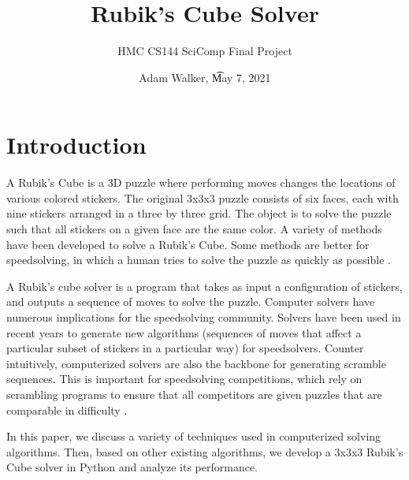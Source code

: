 \documentclass{article}
\title{Rubik's Cube Solver}
\author{HMC CS144 SciComp Final Project}
\date{Adam Walker, \t May 7, 2021}
\begin{document}
\maketitle

\section{Introduction}

A Rubik's Cube is a 3D puzzle where performing moves changes the locations of various colored stickers. The original 3x3x3 puzzle consists of six faces, each with nine stickers arranged in a three by three grid. The object is to solve the puzzle such that all stickers on a given face are the same color. A variety of methods have been developed to solve a Rubik's Cube. Some methods are better for speedsolving, in which a human tries to solve the puzzle as quickly as possible \cite{speedcubing}. 

A Rubik's cube solver is a program that takes as input a configuration of stickers, and outputs a sequence of moves to solve the puzzle. Computer solvers have numerous implications for the speedsolving community. Solvers have been used in recent years to generate new algorithms (sequences of moves that affect a particular subset of stickers in a particular way) for speedsolvers. Counter intuitively, computerized solvers are also the backbone for generating scramble sequences. This is important for speedsolving competitions, which rely on scrambling programs to ensure that all competitors are given puzzles that are comparable in difficulty \cite{wca-scrambles}.


In this paper, we discuss a variety of techniques used in computerized solving algorithms. Then, based on other existing algorithms, we develop a 3x3x3 Rubik's Cube solver in Python and analyze its performance.
\end{document}
